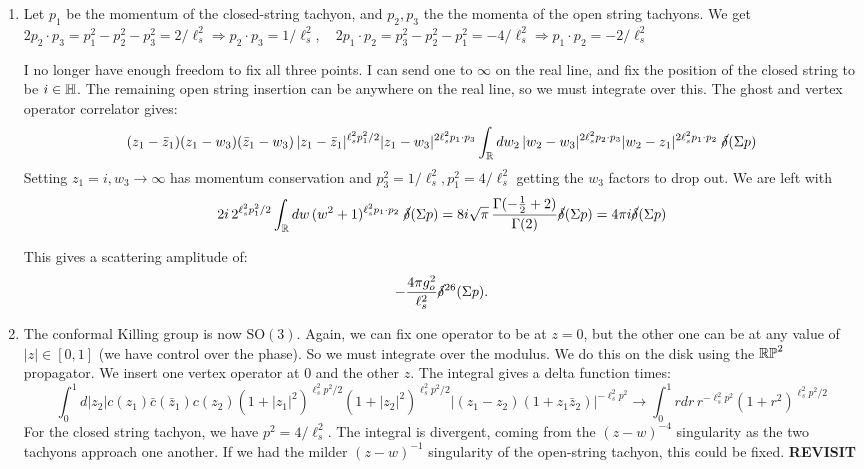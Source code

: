 \documentclass[11pt, class=article, crop=false]{standalone}
\begin{document}
\begin{enumerate}
	\item Let $p_1$ be the momentum of the closed-string tachyon, and $p_2, p_3$ the the momenta of the open string tachyons. We get $2 p_2 \cdot p_3 = p_1^2 - p_2^2 - p_3^2 = 2/\ell_s^2 \Rightarrow p_2 \cdot p_3 = 1/\ell_s^2, \quad 2 p_1 \cdot p_2 = p_3^2 - p_2^2 - p_1^2  = -4/\ell_s^2 \Rightarrow p_1 \cdot p_2 = -2/\ell_s^2$
	
	 I no longer have enough freedom to fix all three points. I can send one to $\infty$ on the real line, and fix the position of the closed string to be $i \in \mathbb{H}$. The remaining open string insertion can be anywhere on the real line, so we must integrate over this. The ghost and vertex operator correlator gives:
	\[
		(z_1 - \bar z_1) (z_1 - w_3) (\bar z_1 - w_3)\,  |z_1 - \bar z_1|^{\ell_s^2 p_1^2/2} |z_1 - w_3|^{2 \ell_s^2 p_1 \cdot p_3} \int_{\mathbb{R}} dw_2 \, |w_2 - w_3|^{2 \ell_s^2 p_2 \cdot p_3} |w_2 - z_1|^{2 \ell_s^2 p_1 \cdot p_2} \; \cancel\delta(\Sigma p)
	\] 
	Setting $z_1 = i, w_3 \to \infty$ has momentum conservation and $p_3^2 = 1/\ell_s^2, p_1^2 = 4/\ell_s^2$ getting the $w_3$ factors to drop out. We are left with
	\[
		2i \,2^{\ell_s^2 p_1^2/2} \int_{\mathbb{R}} dw \, (w^2 + 1)^{\ell_s^2 p_1 \cdot p_2} \; \cancel\delta(\Sigma p) = 8 i \sqrt\pi \,  \frac{ \Gamma(-\frac12 +2)}{\Gamma(2)} \cancel\delta(\Sigma p) = 4\pi i \cancel\delta(\Sigma p)
	\]

	This gives a scattering amplitude of:
	\[
		-\frac{4 \pi g_o^2}{\ell_s^2}  \cancel\delta^{26}(\Sigma p).
	\]

	\item The conformal Killing group is now $\mathrm{SO}(3)$. Again, we can fix one operator to be at $z = 0$, but the other one can be at any value of $|z| \in [0, 1]$ (we have control over the phase). So we must integrate over the modulus. We do this on the disk using the $\mathbb{RP}^2$ propagator. We insert one vertex operator at $0$ and the other $z$. The integral gives a delta function times: 
	\[
		\int_0^1 d|z_2| c(z_1)\bar c(\bar z_1) c(z_2)  (1+|z_1|^2)^{\ell_s^2 p^2/2} (1+|z_2|^2)^{\ell_s^2 p^2/2} |(z_1 - z_2) (1+z_1 \bar z_2)|^{-\ell_s^2 p^2}\to \int_0^1 r dr\, r^{-\ell_s^2 p^2} (1+r^2)^{\ell_s^2 p^2/2}
	\]
	For the closed string tachyon, we have $p^2 = 4/\ell_s^2$. The integral is divergent, coming from the $(z-w)^{-4}$ singularity as the two tachyons approach one another. If we had the milder $(z-w)^{-1}$ singularity of the open-string tachyon, this could be fixed. 
	\textbf{REVISIT}
	

\end{enumerate}
\end{document}
